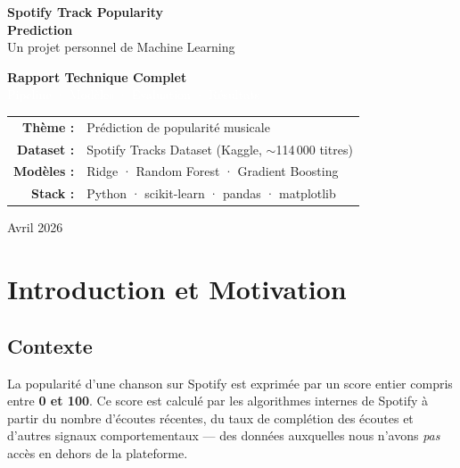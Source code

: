 \documentclass[12pt, a4paper]{article}
\begin{document}
\begin{titlepage}
  \centering
  \vspace*{3cm}
  {\Huge\bfseries\color{spotdark} Spotify Track Popularity}\\[0.4cm]
  {\Huge\bfseries\color{spotgreen} Prediction}\\[0.3cm]
  {\large\color{spotgrey} Un projet personnel de Machine Learning}\\[2cm]

  \begin{tcolorbox}[colback=spotdark, colframe=spotdark, width=0.75\textwidth,
                    halign=center, rounded corners]
    \centering
    \textcolor{spotgreen}{\Large\bfseries Rapport Technique Complet}\\[0.4cm]
    \textcolor{white}{\normalsize Pipeline · Modèles · Évaluation · Résultats}
  \end{tcolorbox}

  \vspace{2cm}
  {\normalsize\color{spotgrey}
    \begin{tabular}{rl}
      \textbf{Thème :}    & Prédiction de popularité musicale\\
      \textbf{Dataset :}  & Spotify Tracks Dataset (Kaggle, \(\sim\)114\,000 titres)\\
      \textbf{Modèles :}  & Ridge · Random Forest · Gradient Boosting\\
      \textbf{Stack :}    & Python · scikit-learn · pandas · matplotlib\\
    \end{tabular}
  }

  \vfill
  {\small\color{spotgrey} Avril 2026}
\end{titlepage}

\tableofcontents
\newpage

\section{Introduction et Motivation}

\subsection{Contexte}

La popularité d'une chanson sur Spotify est exprimée par un score entier compris entre
\textbf{0 et 100}. Ce score est calculé par les algorithmes internes de Spotify à partir
du nombre d'écoutes récentes, du taux de complétion des écoutes et d'autres signaux
comportementaux — des données auxquelles nous n'avons \textit{pas} accès en dehors de la
plateforme.
\end{document}
